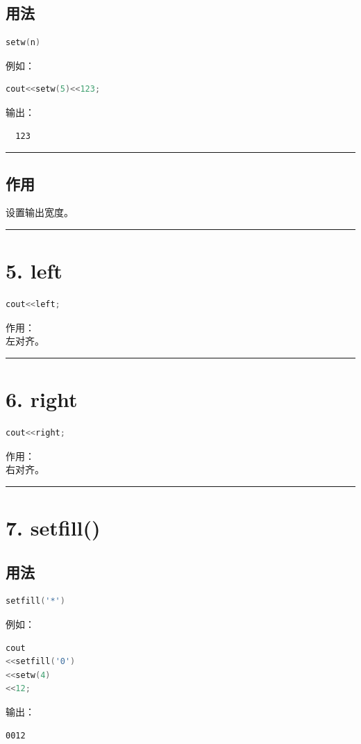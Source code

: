 \documentclass[10pt,twocolumn]{extarticle}
\begin{document}
\subsection{用法}
\begin{lstlisting}[language=C++]
setw(n)
\end{lstlisting}
例如：
\begin{lstlisting}[language=C++]
cout<<setw(5)<<123;
\end{lstlisting}
输出：
\begin{lstlisting}
  123
\end{lstlisting}

\noindent\rule{\linewidth}{0.4pt}

\subsection{作用}
设置输出宽度。

\noindent\rule{\linewidth}{0.4pt}

\section{5. left}
\begin{lstlisting}[language=C++]
cout<<left;
\end{lstlisting}
作用：\\
左对齐。

\noindent\rule{\linewidth}{0.4pt}

\section{6. right}
\begin{lstlisting}[language=C++]
cout<<right;
\end{lstlisting}
作用：\\
右对齐。

\noindent\rule{\linewidth}{0.4pt}

\section{7. setfill()}

\subsection{用法}
\begin{lstlisting}[language=C++]
setfill('*')
\end{lstlisting}
例如：
\begin{lstlisting}[language=C++]
cout
<<setfill('0')
<<setw(4)
<<12;
\end{lstlisting}
输出：
\begin{lstlisting}
0012
\end{lstlisting}
\end{document}
